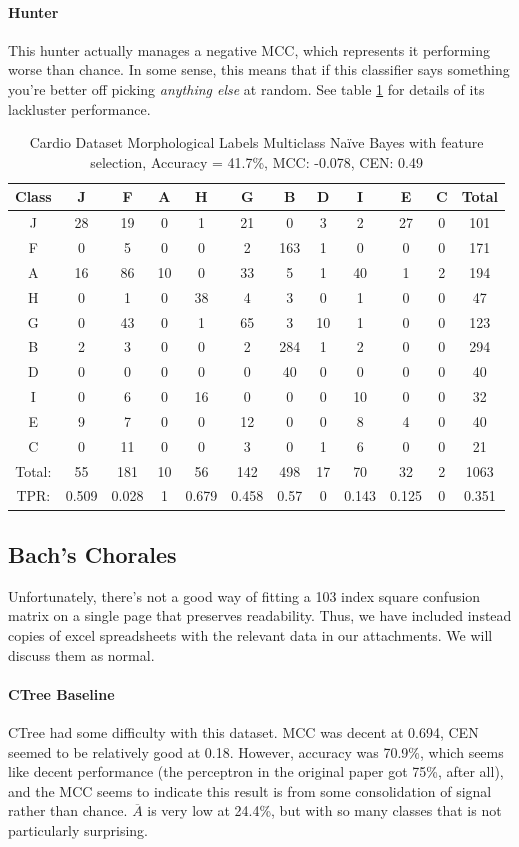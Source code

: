 \paragraph{Hunter}
This hunter actually manages a negative MCC, which represents it performing worse than chance. In some sense, this means that if this classifier says something you're better off picking \textit{anything else} at random.  See table \ref{tab:cardiomorphhunter} for details of its lackluster performance.  
\begin{table}[h!]
	\centering
	\begin{tabular}{|c|c|c|c|c|c|c|c|c|c|c|c|}
		\hline
		Class&J&F&A&H&G&B&D&I&E&C&Total\\\hline
		J&28&19&0&1&21&0&3&2&27&0&101\\
		F&0&5&0&0&2&163&1&0&0&0&171\\
		A&16&86&10&0&33&5&1&40&1&2&194\\
		H&0&1&0&38&4&3&0&1&0&0&47\\
		G&0&43&0&1&65&3&10&1&0&0&123\\
		B&2&3&0&0&2&284&1&2&0&0&294\\
		D&0&0&0&0&0&40&0&0&0&0&40\\
		I&0&6&0&16&0&0&0&10&0&0&32\\
		E&9&7&0&0&12&0&0&8&4&0&40\\
		C&0&11&0&0&3&0&1&6&0&0&21\\\hline
		Total:&55&181&10&56&142&498&17&70&32&2&1063\\
		TPR:&0.509&0.028&1&0.679&0.458&0.57&0&0.143&0.125&0&0.351\\
		\hline
	\end{tabular}
	\caption[Cardiotocography Morphology: Hunter Confusion Matrix]{Cardio Dataset Morphological Labels Multiclass Na\"ive Bayes with feature selection, Accuracy = 41.7\%, MCC: -0.078, CEN: 0.49}
	\label{tab:cardiomorphhunter}
\end{table}


\subsection{Bach's Chorales}
Unfortunately, there's not a good way of fitting a 103 index square confusion matrix on a single page that preserves readability.  Thus, we have included instead copies of excel spreadsheets with the relevant data in our attachments.  We will discuss them as normal.


\paragraph{CTree Baseline}
	CTree had some difficulty with this dataset.  MCC was decent at 0.694, CEN seemed to be relatively good at 0.18.    However, accuracy was 70.9\%, which seems like decent performance (the perceptron in the original paper got 75\%, after all), and the MCC seems to indicate this result is from some consolidation of signal rather than chance.  $\overline{A}$ is very low at 24.4\%, but with so many classes that is not particularly surprising.  

